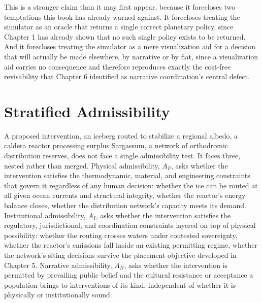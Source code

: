 \documentclass[11pt,oneside]{book}
\begin{document}
This is a stronger claim than it may first appear, because it forecloses two temptations this book has already warned against. It forecloses treating the simulator as an oracle that returns a single correct planetary policy, since Chapter 1 has already shown that no such single policy exists to be returned. And it forecloses treating the simulator as a mere visualization aid for a decision that will actually be made elsewhere, by narrative or by fiat, since a visualization aid carries no consequence and therefore reproduces exactly the cost-free revisability that Chapter 6 identified as narrative coordination's central defect.

\section*{Stratified Admissibility}

A proposed intervention, an iceberg routed to stabilize a regional albedo, a caldera reactor processing surplus Sargassum, a network of orthodromic distribution reserves, does not face a single admissibility test. It faces three, nested rather than merged. Physical admissibility, $A_P$, asks whether the intervention satisfies the thermodynamic, material, and engineering constraints that govern it regardless of any human decision: whether the ice can be routed at all given ocean currents and structural integrity, whether the reactor's energy balance closes, whether the distribution network's capacity meets its demand. Institutional admissibility, $A_I$, asks whether the intervention satisfies the regulatory, jurisdictional, and coordination constraints layered on top of physical possibility: whether the routing crosses waters under contested sovereignty, whether the reactor's emissions fall inside an existing permitting regime, whether the network's siting decisions survive the placement objective developed in Chapter 5. Narrative admissibility, $A_N$, asks whether the intervention is permitted by prevailing public belief and the cultural resistance or acceptance a population brings to interventions of its kind, independent of whether it is physically or institutionally sound.
\end{document}
